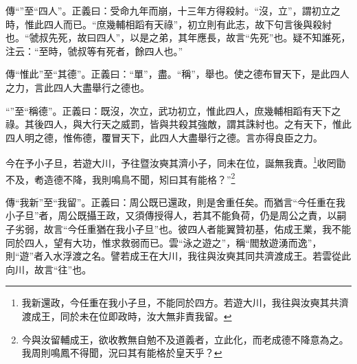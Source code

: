 {\noindent\zhuan{}\fzbyks 傳“”至“四人”。正義曰：受命九年而崩，十三年方得殺紂。“沒，立”，謂初立之時，惟此四人而已。“庶幾輔相蹈有天祿”，初立則有此志，故下句言後與殺紂也。“虢叔先死，故曰四人”，以是之弟，其年應長，故言“先死”也。疑不知誰死，注云：“至時，虢叔等有死者，餘四人也。” \par}

{\noindent\zhuan{}\fzbyks 傳“惟此”至“其德”。正義曰：“單”，盡。“稱”，舉也。使之德布冒天下，是此四人之力，言此四人大盡舉行之德也。 \par}

{\noindent\shu{}\fzkt “”至“稱德”。正義曰：既沒，次立，武功初立，惟此四人，庶幾輔相蹈有天下之祿。其後四人，與大行天之威罰，皆與共殺其強敵，謂其誅紂也。之有天下，惟此四人明之德，惟佈德，覆冒天下，此四人大盡舉行之德。言亦得良臣之力。 \par}

今在予小子旦，若遊大川，予往暨汝奭其濟小子，同未在位，誕無我責。\footnote{我新還政，今任重在我小子旦，不能同於四方。若遊大川，我往與汝奭其共濟渡成王，同於未在位即政時，汝大無非責我留。}收罔勖不及，耇造德不降，我則鳴鳥不聞，矧曰其有能格？”\footnote{今與汝留輔成王，欲收教無自勉不及道義者，立此化，而老成德不降意為之。我周則鳴鳳不得聞，況曰其有能格於皇天乎？}


{\noindent\zhuan{}\fzbyks 傳“我新”至“我留”。正義曰：周公既已還政，則是舍重任矣。而猶言“今任重在我小子旦”者，周公既攝王政，又須傳授得人，若其不能負荷，仍是周公之責，以嗣子劣弱，故言“今任重猶在我小子旦”也。彼四人者能翼贊初基，佑成王業，我不能同於四人，望有大功，惟求救弱而已。雲“泳之遊之”，稱“閻敖遊湧而逸”，則“遊”者入水浮渡之名。譬若成王在大川，我往與汝奭其同共濟渡成王。若雲從此向川，故言“往”也。 \par}

